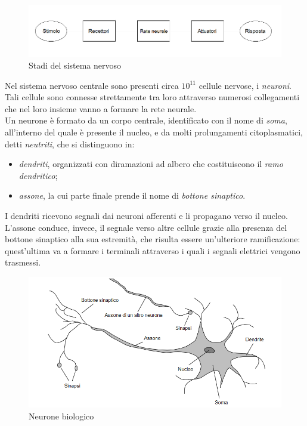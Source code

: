 \documentclass[12pt,a4paper,oneside]{book}
\begin{document}
		\begin{figure}[h]
		\centering
		\includegraphics[width=1\linewidth]{IMMAGINI/Sistemanervoso}
		\caption{Stadi del sistema nervoso}
		\label{fig: stadi sistema nervoso}
		\end{figure}
		
		Nel sistema nervoso centrale sono presenti circa $10^{11}$ cellule nervose, i \emph{neuroni}. Tali cellule sono connesse strettamente tra loro attraverso numerosi collegamenti che nel loro insieme vanno a formare la rete neurale. \\
		Un neurone è formato da un corpo centrale, identificato con il nome di \emph{soma}, all'interno del quale è presente il nucleo, e da molti prolungamenti citoplasmatici, detti \emph{neutriti}, che si distinguono in:
		 
		 \begin{itemize}
		 	\item \emph{dendriti}, organizzati con diramazioni ad albero che costituiscono il \emph{ramo dendritico};
		 	\item \emph{assone}, la cui parte finale prende il nome di \emph{bottone sinaptico}.
		 \end{itemize}
		 
		 I dendriti ricevono segnali dai neuroni afferenti e li propagano verso il nucleo. L'assone conduce, invece, il segnale verso altre cellule grazie alla presenza del bottone sinaptico alla sua estremità, che risulta essere un'ulteriore ramificazione: quest'ultima va a formare i terminali attraverso i quali i segnali elettrici vengono trasmessi.\\
		 
		 \begin{figure}[h]
		 	\centering
		 	\includegraphics[width=1\linewidth]{IMMAGINI/neuron}
		 	\caption{Neurone biologico}
		 	\label{fig:neuron}
		 \end{figure}
	 
\end{document}
